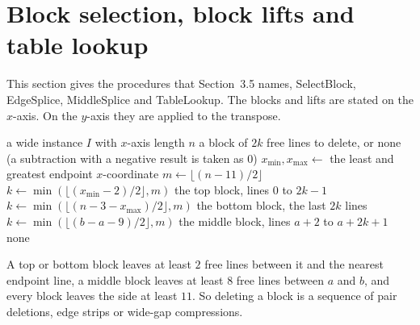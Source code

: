 \documentclass[11pt]{article}
\begin{document}
\section{Block selection, block lifts and table lookup}\label{sec:blocks}

This section gives the procedures that Section~3.5 names, SelectBlock, EdgeSplice, MiddleSplice
and TableLookup. The blocks and lifts are stated on the $x$-axis. On the $y$-axis they are applied
to the transpose.

\begin{algorithm}[H]
\caption{SelectBlock$(I)$}\label{alg:select}
\begin{algorithmic}[1]
\Require a wide instance $I$ with $x$-axis length $n$
\Ensure a block of $2k$ free lines to delete, or none
\Statex \hspace{\algorithmicindent}(a subtraction with a negative result is taken as $0$)
\State $x_{\min}, x_{\max} \gets$ the least and greatest endpoint $x$-coordinate
\State $m \gets \lfloor (n-11)/2\rfloor$
\State $k \gets \min(\lfloor (x_{\min}-2)/2\rfloor, m)$
 \Return the top block, lines $0$ to $2k-1$ \EndIf
\State $k \gets \min(\lfloor (n-3-x_{\max})/2\rfloor, m)$
 \Return the bottom block, the last $2k$ lines \EndIf
{}
    \State $k \gets \min(\lfloor (b-a-9)/2\rfloor, m)$
      \State \Return the middle block, lines $a+2$ to $a+2k+1$
    \EndIf
  \EndFor
\EndFor
\State \Return none
\end{algorithmic}
\end{algorithm}

A top or bottom block leaves at least $2$ free lines between it and the nearest endpoint line, a
middle block leaves at least $8$ free lines between $a$ and $b$, and every block leaves the side at
least $11$. So deleting a block is a sequence of pair deletions, edge strips or wide-gap
compressions.
\end{document}
